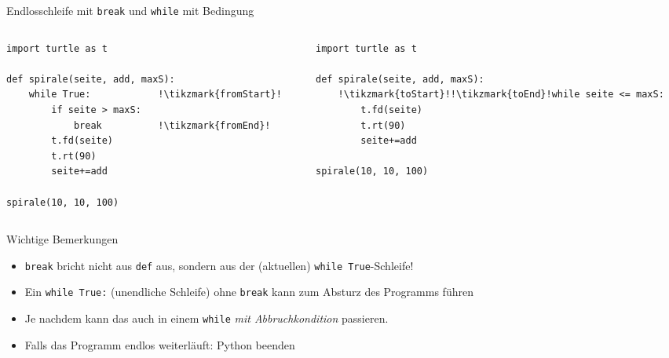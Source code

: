 \begin{frame}[fragile]{Endlosschleife mit \lstinline|break| und \lstinline|while| mit Bedingung}
    \begin{columns}
        \begin{column}{.47\textwidth}
            \begin{lstlisting}[escapechar=!,basicstyle=\footnotesize\ttfamily]
import turtle as t

def spirale(seite, add, maxS):
    while True:            !\tikzmark{fromStart}!
    	if seite > maxS:
    	    break          !\tikzmark{fromEnd}!
        t.fd(seite)
        t.rt(90)
        seite+=add

spirale(10, 10, 100)
\end{lstlisting}
        \end{column}
        \begin{column}{.5\textwidth}
            \begin{lstlisting}[escapechar=!,basicstyle=\footnotesize\ttfamily]
import turtle as t

def spirale(seite, add, maxS):
    !\tikzmark{toStart}!!\tikzmark{toEnd}!while seite <= maxS:
        t.fd(seite)
        t.rt(90)
        seite+=add

spirale(10, 10, 100)
\end{lstlisting}
        \end{column}
    \end{columns}

\end{frame}

\begin{frame}[fragile]{Wichtige Bemerkungen}
    \begin{itemize}[<+->]
        \item \lstinline|break| bricht nicht aus \lstinline|def| aus, sondern aus der (aktuellen) \lstinline|while True|-Schleife!
        \item Ein \lstinline|while True:| (unendliche Schleife) ohne \lstinline|break| kann zum Absturz des Programms führen 
        \item Je nachdem kann das auch in einem \lstinline|while| \textit{mit Abbruchkondition} passieren.
        \item Falls das Programm endlos weiterläuft: Python beenden \faTrash
    \end{itemize}
\end{frame}

